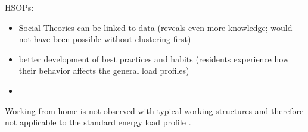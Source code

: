 HSOPs:
\begin{itemize}
    \item Social Theories can be linked to data (reveals even more knowledge; would not have been possible without clustering first)
    \item better development of best practices and habits (residents experience how their behavior affects the general load profiles)
    \item 
\end{itemize}

Working from home is not observed with typical working structures and therefore not applicable to the standard energy load profile \cite{HAM-EED}. 